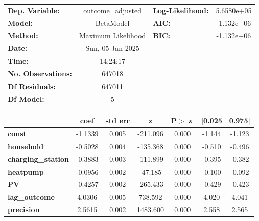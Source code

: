 \begin{center}
\begin{tabular}{lclc}
\toprule
\textbf{Dep. Variable:}    & outcome\_adjusted  & \textbf{  Log-Likelihood:    } & 5.6580e+05  \\
\textbf{Model:}            &     BetaModel      & \textbf{  AIC:               } & -1.132e+06  \\
\textbf{Method:}           & Maximum Likelihood & \textbf{  BIC:               } & -1.132e+06  \\
\textbf{Date:}             &  Sun, 05 Jan 2025  & \textbf{                     } &             \\
\textbf{Time:}             &      14:24:17      & \textbf{                     } &             \\
\textbf{No. Observations:} &       647018       & \textbf{                     } &             \\
\textbf{Df Residuals:}     &       647011       & \textbf{                     } &             \\
\textbf{Df Model:}         &            5       & \textbf{                     } &             \\
\bottomrule
\end{tabular}
\begin{tabular}{lcccccc}
                           & \textbf{coef} & \textbf{std err} & \textbf{z} & \textbf{P$> |$z$|$} & \textbf{[0.025} & \textbf{0.975]}  \\
\midrule
\textbf{const}             &      -1.1339  &        0.005     &  -211.096  &         0.000        &       -1.144    &       -1.123     \\
\textbf{household}         &      -0.5028  &        0.004     &  -135.368  &         0.000        &       -0.510    &       -0.496     \\
\textbf{charging\_station} &      -0.3883  &        0.003     &  -111.899  &         0.000        &       -0.395    &       -0.382     \\
\textbf{heatpump}          &      -0.0956  &        0.002     &   -47.185  &         0.000        &       -0.100    &       -0.092     \\
\textbf{PV}                &      -0.4257  &        0.002     &  -265.433  &         0.000        &       -0.429    &       -0.423     \\
\textbf{lag\_outcome}      &       4.0306  &        0.005     &   738.592  &         0.000        &        4.020    &        4.041     \\
\textbf{precision}         &       2.5615  &        0.002     &  1483.600  &         0.000        &        2.558    &        2.565     \\
\bottomrule
\end{tabular}
\end{center}